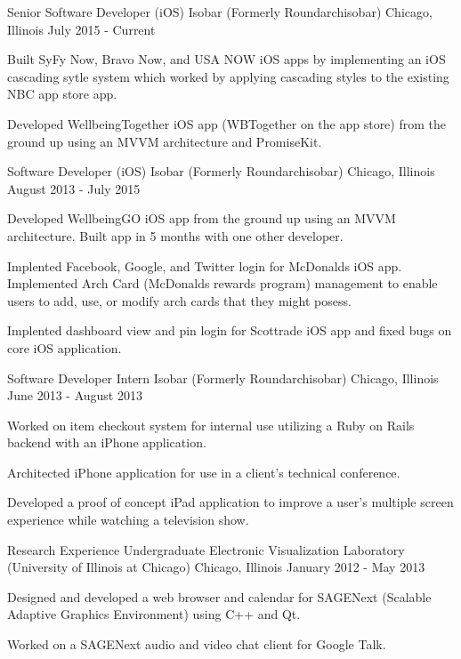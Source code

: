 \begin{cventries}
  \cventry
    {Senior Software Developer (iOS)}
    {Isobar (Formerly Roundarchisobar)}
    {Chicago, Illinois}
    {July 2015 - Current}
    {
      \begin{cvitems}
        \item {Built SyFy Now, Bravo Now, and USA NOW iOS apps by implementing an iOS cascading sytle system which worked by applying cascading styles to the existing NBC app store app. }
        \item {Developed WellbeingTogether iOS app (WBTogether on the app store) from the ground up using an MVVM architecture and PromiseKit.}
      \end{cvitems}
    }
  \cventry
    {Software Developer (iOS)}
    {Isobar (Formerly Roundarchisobar)}
    {Chicago, Illinois}
    {August 2013 - July 2015}
    {
      \begin{cvitems}
        \item {Developed WellbeingGO iOS app from the ground up using an MVVM architecture. Built app in 5 months with one other developer.}
        \item {Implented Facebook, Google, and Twitter login for McDonalds iOS app. Implemented Arch Card (McDonalds rewards program) 
        management to enable users to add, use, or modify arch cards that they might posess.}
        \item {Implented dashboard view and pin login for Scottrade iOS app and fixed bugs on core iOS application.}
      \end{cvitems}
    }
  \cventry
    {Software Developer Intern}
    {Isobar (Formerly Roundarchisobar)}
    {Chicago, Illinois}
    {June 2013 - August 2013}
    {
      \begin{cvitems}
        \item {Worked on item checkout system for internal use utilizing a Ruby on Rails backend with an iPhone application.}
        \item {Architected iPhone application for use in a client's technical conference.}
        \item {Developed a proof of concept iPad application to improve a user’s multiple screen experience while watching a television show.}
      \end{cvitems}
    }
  \cventry
    {Research Experience Undergraduate}
    {Electronic Visualization Laboratory (University of Illinois at Chicago)}
    {Chicago, Illinois}
    {January 2012 - May 2013}
    {
      \begin{cvitems}
        \item {Designed and developed a web browser and calendar for SAGENext (Scalable Adaptive Graphics Environment) using C++ and Qt.}
        \item {Worked on a SAGENext audio and video chat client for Google Talk.}
      \end{cvitems}
    }
\end{cventries}
